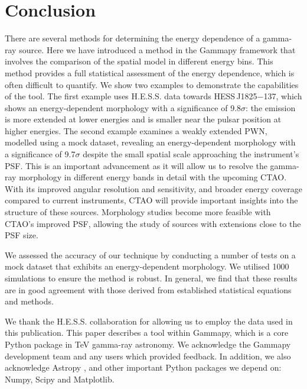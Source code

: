 \documentclass{aa}
\newcommand{\hessj}{HESS\,J1825$-$137\xspace}
\begin{document}
\section{Conclusion}
There are several methods for determining the energy dependence of a gamma-ray source. Here we have introduced a method in the Gammapy framework that involves the comparison of the spatial model in different energy bins. This method provides a full statistical assessment of the energy dependence, which is often difficult to quantify. 
We show two examples to demonstrate the capabilities of the tool. 
The first example uses H.E.S.S. data towards \hessj, which shows an energy-dependent morphology with a significance of 9.8$\sigma$: the emission is more extended at lower energies and is smaller near the pulsar position at higher energies. The second example examines a weakly extended PWN, modelled using a mock dataset, revealing an energy-dependent morphology with a significance of 9.7$\sigma$ despite the small spatial scale approaching the instrument’s PSF. 
This is an important advancement as it will allow us to resolve the gamma-ray morphology in different energy bands in detail with the upcoming CTAO. With its improved angular resolution and sensitivity, and broader energy coverage compared to current instruments, CTAO will provide important insights into the structure of these sources. 
Morphology studies become more feasible with CTAO's improved PSF, allowing the study of sources with extensions close to the PSF size.

We assessed the accuracy of our technique by conducting a number of tests on a mock dataset that exhibits an energy-dependent morphology. We utilised 1000 simulations to ensure the method is robust. 
In general, we find that these results are in good agreement with those derived from established statistical equations and methods. 

\begin{acknowledgements}
We thank the H.E.S.S. collaboration for allowing us to employ the data used in this publication. 
This paper describes a tool within Gammapy, which is a core Python package in TeV gamma-ray astronomy. We acknowledge the Gammapy development team and any users which provided feedback. In addition, we also acknowledge Astropy \citep[a Python package with which we are affiliated with,][]{2013_astropy}, and other important Python packages we depend on: Numpy, Scipy and Matplotlib.
\end{acknowledgements}



\end{document}

